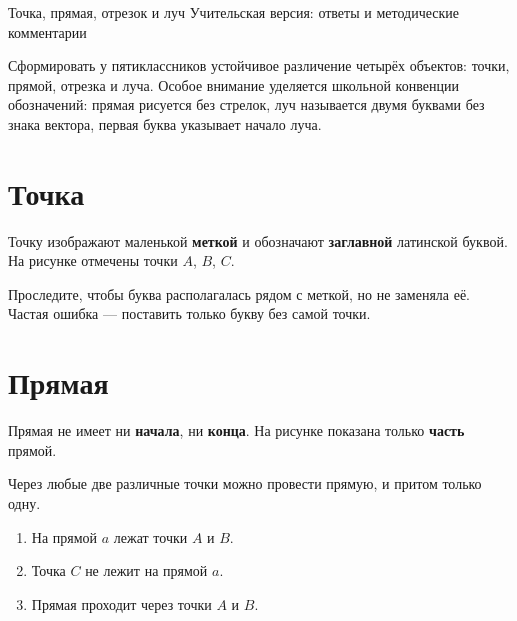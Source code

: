 
\worksheettitle
  {Точка, прямая, отрезок и луч}
  {Учительская версия: ответы и методические комментарии}

\begin{teacherbox}
  Сформировать у пятиклассников устойчивое различение четырёх объектов:
  точки, прямой, отрезка и луча. Особое внимание уделяется школьной
  конвенции обозначений: прямая рисуется без стрелок, луч называется двумя
  буквами без знака вектора, первая буква указывает начало луча.
\end{teacherbox}

\section{Точка}

\pointsexamplefigure

\begin{propertybox}[Ответ]
  Точку изображают маленькой \textbf{меткой} и обозначают
  \textbf{заглавной} латинской буквой. На рисунке отмечены точки
  \(A\), \(B\), \(C\).
\end{propertybox}

\begin{teacherbox}[Диагностика]
  Проследите, чтобы буква располагалась рядом с меткой, но не заменяла её.
  Частая ошибка — поставить только букву без самой точки.
\end{teacherbox}

\section{Прямая}

\lineexamplefigure

\begin{propertybox}[Ответ]
  Прямая не имеет ни \textbf{начала}, ни \textbf{конца}. На рисунке показана
  только \textbf{часть} прямой.
\end{propertybox}

\begin{propertybox}
  Через любые две различные точки можно провести прямую, и притом только
  одну.
\end{propertybox}

\incidenceexamplefigure

\begin{practicebox}
  \begin{enumerate}[label=\alph*),itemsep=0.35em]
    \item На прямой \(a\) лежат точки \(A\) и \(B\).
    \item Точка \(C\) не лежит на прямой \(a\).
    \item Прямая проходит через точки \(A\) и \(B\).
  \end{enumerate}
\end{practicebox}

